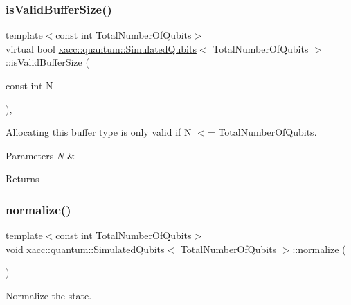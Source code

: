 \subsubsection{\texorpdfstring{is\+Valid\+Buffer\+Size()}{isValidBufferSize()}}
{\footnotesize\ttfamily template$<$const int Total\+Number\+Of\+Qubits$>$ \\
virtual bool \hyperlink{a01248}{xacc\+::quantum\+::\+Simulated\+Qubits}$<$ Total\+Number\+Of\+Qubits $>$\+::is\+Valid\+Buffer\+Size (\begin{DoxyParamCaption}\item[{const int}]{N }\end{DoxyParamCaption})\hspace{0.3cm}{\ttfamily [inline]}, {\ttfamily [virtual]}}

Allocating this buffer type is only valid if N $<$= Total\+Number\+Of\+Qubits. 
\begin{DoxyParams}{Parameters}
{\em N} & \\
\hline
\end{DoxyParams}
\begin{DoxyReturn}{Returns}

\end{DoxyReturn}
\mbox{\label{a01248_aea8a0358100e815a7c70eee7f8ba9d45}} 
\subsubsection{\texorpdfstring{normalize()}{normalize()}}
{\footnotesize\ttfamily template$<$const int Total\+Number\+Of\+Qubits$>$ \\
void \hyperlink{a01248}{xacc\+::quantum\+::\+Simulated\+Qubits}$<$ Total\+Number\+Of\+Qubits $>$\+::normalize (\begin{DoxyParamCaption}{ }\end{DoxyParamCaption})\hspace{0.3cm}{\ttfamily [inline]}}

Normalize the state. \mbox{\label{a01248_ad9a39b44161fa0309167b9791ed10945}} 
